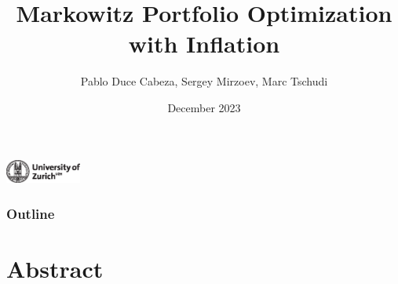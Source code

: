 \documentclass{beamer}
\title{Markowitz Portfolio Optimization with Inflation}
\author{Pablo Duce Cabeza, Sergey Mirzoev, Marc Tschudi}
\date{December 2023}
\begin{document}
\begin{frame}
\titlepage
\begin{center}
    \includegraphics[width=2.5cm,keepaspectratio]{figure/uzh_logo_e_pos.eps}
\end{center}
\end{frame}


\begin{frame}
\frametitle{Outline}
\tableofcontents
\end{frame}






\section{Abstract}
\end{document}
